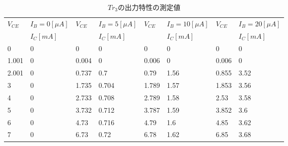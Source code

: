 \documentclass[10pt, a4j, dvipdfmx]{jarticle}
\begin{document}
    \begin{table}[H]
        \centering
        \caption{$Tr_3$の出力特性の測定値}
        \label{tbl:6}
        \small
        \begin{tabular}{|l|l||l|l||l|l||l|l|}
        \hline
        \multirow{2}{*}{$V_{CE}$} & $I_B=0[\mu A]$ & \multirow{2}{*}{$V_{CE}$} & $I_B=5[\mu A]$ & \multirow{2}{*}{$V_{CE}$} & $I_B=10[\mu A]$ & \multirow{2}{*}{$V_{CE}$} & $I_B=20[\mu A]$ \\ \cline{2-2} \cline{4-4} \cline{6-6} \cline{8-8} 
                                    & $I_C[mA]$      &                           & $I_C[mA]$      &                           & $I_C[mA]$       &                           & $I_C[mA]$       \\ \hline
        0                         & 0              & 0                         & 0              & 0                         & 0               & 0                         & 0               \\ \hline
        1.001                     & 0              & 0.004                     & 0              & 0.006                     & 0               & 0.006                     & 0               \\ \hline
        2.001                     & 0              & 0.737                     & 0.7            & 0.79                      & 1.56            & 0.855                     & 3.52            \\ \hline
        3                         & 0              & 1.735                     & 0.704          & 1.789                     & 1.57            & 1.853                     & 3.56            \\ \hline
        4                         & 0              & 2.733                     & 0.708          & 2.789                     & 1.58            & 2.53                      & 3.58            \\ \hline
        5                         & 0              & 3.732                     & 0.712          & 3.787                     & 1.59            & 3.852                     & 3.6             \\ \hline
        6                         & 0              & 4.73                      & 0.716          & 4.79                      & 1.6             & 4.85                      & 3.62            \\ \hline
        7                         & 0              & 6.73                      & 0.72           & 6.78                      & 1.62            & 6.85                      & 3.68            \\ \hline

\end{tabular}
\end{table}
\end{document}
